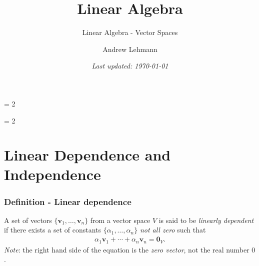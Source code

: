 \documentclass[usenames,dvipsnames,aspectratio=169,10pt]{beamer}
\def \SCHOOLVERSION {2} %
\numberwithin{equation}{section}
\begin{document}
\title{Linear Algebra}
\subtitle{Linear Algebra - Vector Spaces}
\author{Andrew Lehmann}
\ifnum \SCHOOLVERSION = 2
\fi
\date{\textit{Last updated: \today}}

\ifnum \SCHOOLVERSION = 2
\fi


\begin{frame}
\titlepage
\end{frame}




\section{Linear Dependence and Independence}


\begin{frame}
\frametitle{Definition - Linear dependence}
A set of vectors $\{\mathbf{v}_1, \dots, \mathbf{v}_n\}$ from a vector space $V$ is said to be \textit{linearly dependent} if there exists a set of constants $\{ \alpha_1, \dots, \alpha_n \}$ \textit{not all zero} such that
\begin{align*}
\alpha_1 \mathbf{v}_1 + \cdots + \alpha_n \mathbf{v}_n = \mathbf{0}_V.
\end{align*}
\textit{Note}: the right hand side of the equation is the \textit{zero vector}, not the real number $0$.
\end{frame}
\end{document}

